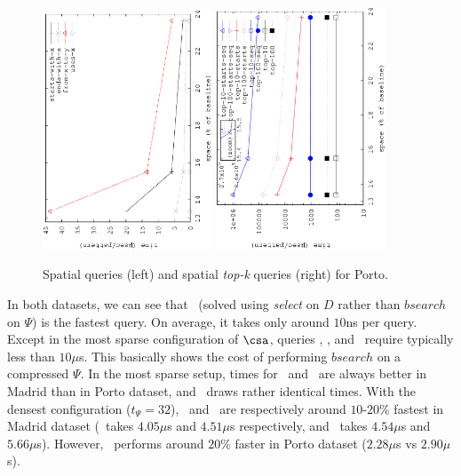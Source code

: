 \begin{figure}[htb]
	\begin{center}
		{\includegraphics[angle=-90,width=0.45\textwidth]{figures_synt/porto_spatial.eps}}
		{\includegraphics[angle=-90,width=0.45\textwidth]{figures_synt/porto_spatial_topk.eps}}
	\end{center}
	\vspace{-0.3cm}
	\caption{Spatial queries (left) and spatial {\em top-k} queries (right) for Porto.}
	\label{fig:portosp}
\end{figure}

In both datasets, we can see that \Sux\ (solved using {\em select} on $D$ rather than
$bsearch$ on $\Psi$) is the fastest query. On average, it takes only around $10$ns
per query. Except in the most sparse configuration of $\csa$, queries \Sewx, \Sswx, and 
\Sfxty\ require typically less than $10\mu$s. This basically shows the cost of performing
$bsearch$ on a compressed $\Psi$. In the most sparse setup, times for \Sswx\ and \Sfxty\ are always better 
in Madrid than in Porto dataset, and \Sewx\ draws rather identical times.
With the densest configuration  ($t_{\Psi}=32$), \Sewx\ and \Sfxty\ are respectively 
around $10$-$20$\% fastest in Madrid dataset (\Sewx\ takes $4.05\mu$s and $4.51\mu$s respectively, and
\Sfxty\ takes $4.54\mu$s and $5.66\mu$s). However, \Sswx\ performs around $20$\% faster in Porto dataset 
($2.28\mu$s vs $2.90\mu$s).
\medskip

